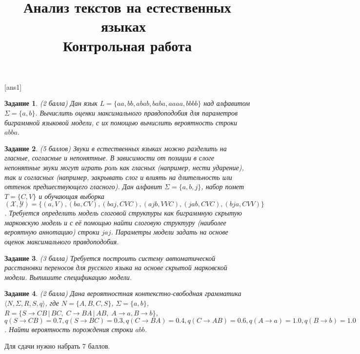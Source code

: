 \documentclass[10pt]{article}
\theoremstyle{example-style}
\newtheorem{example}{Задание}
\begin{document}
 

\title{Анализ текстов на естественных языках\ \\{\large Контрольная работа}}
\author{}
\date{}

\maketitle

[ans1]


\begin{example}
\textit{(2 балла)} Дан язык $L = \{aa, bb, abab, baba, aaaa, bbbb\}$ над алфавитом $\Sigma = \{a, b\}$. Вычислить оценки максимального правдоподобия для параметров биграммной языковой модели, с их помощью вычислить вероятность строки $abba$.
\end{example}

\begin{example}
\textit{(5 баллов)} Звуки в естественных языках можно разделить на гласные, согласные и непонятные. В зависимости от позиции в слоге непонятные звуки могут играть роль как гласных (например, нести ударение), так и согласных (например, закрывать слог и влиять на длительность или оттенок предшествующего гласного). Дан алфавит $\Sigma = \{a, b, j\}$, набор помет $T = \{C, V\}$ и обучающая выборка $(\mathcal{X}, \mathcal{Y}) = \{(a, V), (ba, CV), (baj, CVC), (ajb, VVC), (jab, CVC), (bja, CVV) \}$. Требуется определить модель слоговой структуры как биграммную скрытую марковскую модель и с её помощью найти слоговую структуру (наиболее вероятную аннотацию) строки $jaj$. Параметры модели задать на основе оценок максимального правдоподобия.
\end{example}

\begin{example}
\textit{(3 балла)} Требуется построить систему автоматической расстановки переносов для русского языка на основе скрытой марковской модели. Выпишите спецификацию модели.
\end{example}

\begin{example}
\textit{(2 балла)} Дана вероятностная контекстно-свободная грамматика $\langle N, \Sigma, R, S, q \rangle$, где $N = \{ A, B, C, S \}$, $\Sigma = \{a, b\}$,
$R = \{ S \to CB \, | \, BC, \; C \to BA \, | \, AB, \; A \to a, B \to b \}$, 
$q(S \to CB) = 0.7, q(S \to BC) = 0.3, q(C \to BA) = 0.4, q(C \to AB) = 0.6, q(A \to a) = 1.0, q(B \to b) = 1.0$.
Найти вероятность порождения строки $abb$.
\end{example}


\bigskip
Для сдачи нужно набрать 7 баллов.
\end{document}
